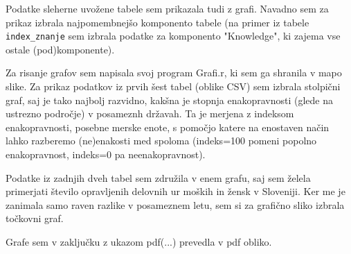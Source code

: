 \documentclass[11pt,a4paper]{article}
\begin{document}
Podatke sleherne uvožene tabele sem prikazala tudi z grafi. Navadno sem za prikaz izbrala najpomembnejšo komponento tabele (na primer iz tabele \verb-index_znanje- sem izbrala podatke za komponento "Knowledge", ki zajema vse ostale (pod)komponente). 

Za risanje grafov sem napisala svoj program Grafi.r, ki sem ga shranila v mapo slike.
Za prikaz podatkov iz prvih šest tabel (oblike CSV) sem izbrala stolpični graf, saj je tako najbolj razvidno, kakšna je stopnja enakopravnosti (glede na ustrezno področje) v posameznh  državah. Ta je merjena z indeksom enakopravnosti, posebne merske enote, s pomočjo katere na enostaven način lahko razberemo (ne)enakosti med spoloma (indeks=100 pomeni popolno enakopravnost, indeks=0 pa neenakopravnost).

Podatke iz zadnjih dveh tabel sem združila v enem grafu, saj sem želela primerjati število opravljenih delovnih ur moških in žensk v Sloveniji. Ker me je zanimala samo raven razlike v posameznem letu, sem si za grafično sliko izbrala točkovni graf.

Grafe sem v zaključku z ukazom pdf(...) prevedla v pdf obliko.






\end{document}
